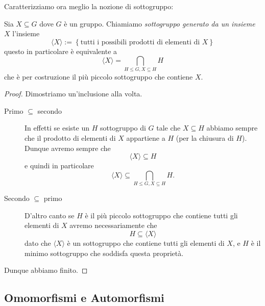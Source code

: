 \documentclass[11pt]{scrartcl}
\begin{document}
	Caratterizziamo ora meglio la nozione di sottogruppo:
	\begin{definition}
		Sia $X\subseteq G$ dove $G$ è un gruppo. Chiamiamo \textit{sottogruppo generato da un insieme} $X$ l'insieme 
		$$\langle X \rangle := \left\{\text{tutti i possibili prodotti di elementi di $X$}\right\}$$
		questo in particolare è equivalente a 
		$$\langle X \rangle = \bigcap_{H\le G, X \subseteq H} H$$
		che è per costruzione il più piccolo sottogruppo che contiene $X$.
	\end{definition}
	\begin{proof}
		Dimostriamo un'inclusione alla volta. 
		\begin{description}
			\item[Primo $\subseteq$ secondo] In effetti se esiste un $H$ sottogruppo di $G$ tale che $X\subseteq H$ abbiamo sempre che il prodotto di elementi di $X$ appartiene a $H$ (per la chiusura di $H$). Dunque avremo sempre che 
			$$\langle X \rangle \subseteq H$$
			e quindi in particolare 
			$$\langle X \rangle \subseteq \bigcap_{H\le G, X \subseteq H} H.$$
			\item[Secondo $\subseteq$ primo] D'altro canto se $H$ è il più piccolo sottogruppo che contiene tutti gli elementi di $X$ avremo necessariamente che 
			$$H\subseteq \langle X \rangle$$
			dato che $\langle X \rangle$ è un sottogruppo che contiene tutti gli elementi di $X$, e $H$ è il minimo sottogruppo che soddisfa questa proprietà.
		\end{description}
		Dunque abbiamo finito.
	\end{proof}
	\newpage
	
	\subsection{Omomorfismi e Automorfismi}
	
\end{document}

